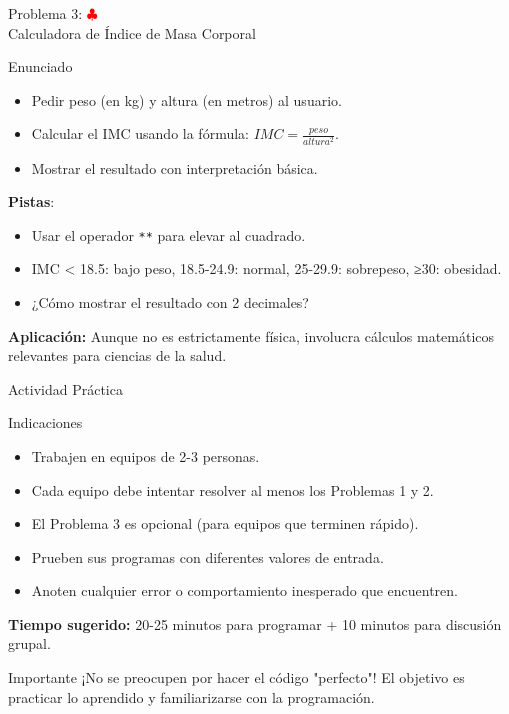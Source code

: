\documentclass[10pt]{beamer}
\begin{document}
\begin{frame}{Problema 3: \hfill \textcolor{red}{$\clubsuit$} \\ Calculadora de Índice de Masa Corporal}
\begin{block}{Enunciado}
  \begin{itemize}
    \item Pedir peso (en kg) y altura (en metros) al usuario.
    \item Calcular el IMC usando la fórmula: \(IMC = \frac{peso}{altura^2}\).
    \item Mostrar el resultado con interpretación básica.
  \end{itemize}
\end{block}
\textbf{Pistas}:
\begin{itemize}
  \item Usar el operador \texttt{**} para elevar al cuadrado.
  \item IMC < 18.5: bajo peso, 18.5-24.9: normal, 25-29.9: sobrepeso, ≥30: obesidad.
  \item ¿Cómo mostrar el resultado con 2 decimales?
\end{itemize}

\textbf{Aplicación:} Aunque no es estrictamente física, involucra cálculos matemáticos relevantes para ciencias de la salud.

\end{frame}

\begin{frame}{Actividad Práctica}
\begin{block}{Indicaciones}
  \begin{itemize}
    \item Trabajen en equipos de 2-3 personas.
    \item Cada equipo debe intentar resolver al menos los Problemas 1 y 2.
    \item El Problema 3 es opcional (para equipos que terminen rápido).
    \item Prueben sus programas con diferentes valores de entrada.
    \item Anoten cualquier error o comportamiento inesperado que encuentren.
  \end{itemize}
\end{block}

\textbf{Tiempo sugerido:} 20-25 minutos para programar + 10 minutos para discusión grupal.

\begin{alertblock}{Importante}
¡No se preocupen por hacer el código "perfecto"! El objetivo es practicar lo aprendido y familiarizarse con la programación.
\end{alertblock}
\end{frame}
\end{document}
